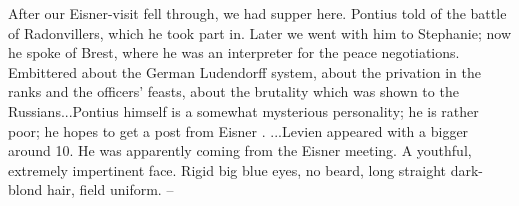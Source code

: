 \missing

After our Eisner-visit fell through, we had supper here. Pontius told of the battle of Radonvillers, which he took part in. Later we went with him to Stephanie; now he spoke of Brest, where he was an interpreter for the peace negotiations. Embittered about the German Ludendorff system, about the privation in the ranks and the officers' feasts, about the brutality which was shown to the Russians...Pontius himself is a somewhat mysterious personality; he is rather poor; he hopes to get a post from Eisner . ...Levien appeared with a bigger  around 10. He was apparently coming from the Eisner meeting. A youthful, extremely impertinent face. Rigid big blue eyes, no beard, long straight dark-blond hair, field uniform. -- 


